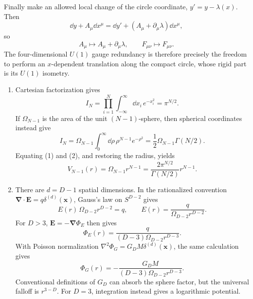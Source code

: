 \begin{enumerate}
  Finally make an allowed local change of the circle coordinate,
  \(y'=y-\lambda(x)\).  Then
  \[
    \dd y+A_\mu \dd x^\mu
      =\dd y'+(A_\mu+\partial_\mu\lambda)\dd x^\mu,
  \]
  so
  \[
    A_\mu\longmapsto A_\mu+\partial_\mu\lambda,
    \qquad F_{\mu\nu}\longmapsto F_{\mu\nu}.
  \]
  The four-dimensional \(U(1)\) gauge redundancy is therefore precisely
  the freedom to perform an \(x\)-dependent translation along the compact
  circle, whose rigid part is its \(U(1)\) isometry.

  \begin{enumerate}
    \item Cartesian factorization gives
      \[
        I_N=\prod_{i=1}^N\int_{-\infty}^{\infty}\dd x_i\,e^{-x_i^2}
          =\pi^{N/2}.
      \tag{1}
      \]
      If \(\Omega_{N-1}\) is the area of the unit \((N-1)\)-sphere, then
      spherical coordinates instead give
      \[
        I_N=\Omega_{N-1}\int_0^\infty \dd\rho\,
             \rho^{N-1}e^{-\rho^2}
          =\frac12\Omega_{N-1}\Gamma(N/2).
      \tag{2}
      \]
      Equating (1) and (2), and restoring the radius, yields
      \[
        \boxed{V_{N-1}(r)=\Omega_{N-1}r^{N-1}
          =\frac{2\pi^{N/2}}{\Gamma(N/2)}r^{N-1}.}
      \]

    \item There are \(d=D-1\) spatial dimensions.  In the rationalized
      convention \(\boldsymbol\nabla\mathbin{\cdot}\mathbf E
      =q\delta^{(d)}(\mathbf x)\), Gauss's law on \(S^{D-2}\) gives
      \[
        E(r)\,\Omega_{D-2}r^{D-2}=q,
        \qquad
        E(r)=\frac{q}{\Omega_{D-2}r^{D-2}}.
      \]
      For \(D>3\), \(\mathbf E=-\boldsymbol\nabla\Phi_E\) then gives
      \[
        \boxed{\Phi_E(r)=
          \frac{q}{(D-3)\Omega_{D-2}r^{D-3}}.}
      \tag{3}
      \]
      With Poisson normalization
      \(\nabla^2\Phi_G=G_DM\delta^{(d)}(\mathbf x)\), the same calculation
      gives
      \[
        \boxed{\Phi_G(r)=-
          \frac{G_DM}{(D-3)\Omega_{D-2}r^{D-3}}.}
      \tag{4}
      \]
      Conventional definitions of \(G_D\) can absorb the sphere factor,
      but the universal falloff is \(r^{3-D}\).  For \(D=3\), integration
      instead gives a logarithmic potential.


\end{enumerate}
\end{enumerate}
